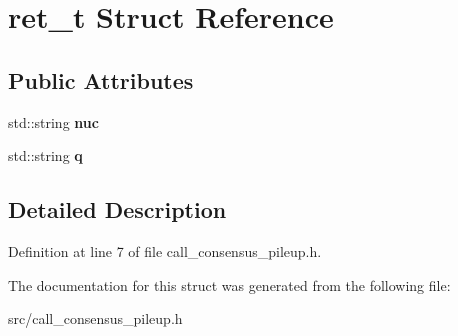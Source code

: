 \hypertarget{structret__t}{}\section{ret\+\_\+t Struct Reference}
\label{structret__t}
\subsection*{Public Attributes}
\begin{DoxyCompactItemize}
\item 
\mbox{\label{structret__t_a168db168b08b1ba42921e902152b6fd1}} 
std\+::string {\bfseries nuc}
\item 
\mbox{\label{structret__t_ac01ffc94dc780b39df879a5cccbc30d6}} 
std\+::string {\bfseries q}
\end{DoxyCompactItemize}


\subsection{Detailed Description}


Definition at line 7 of file call\+\_\+consensus\+\_\+pileup.\+h.



The documentation for this struct was generated from the following file\+:\begin{DoxyCompactItemize}
\item 
src/call\+\_\+consensus\+\_\+pileup.\+h\end{DoxyCompactItemize}
